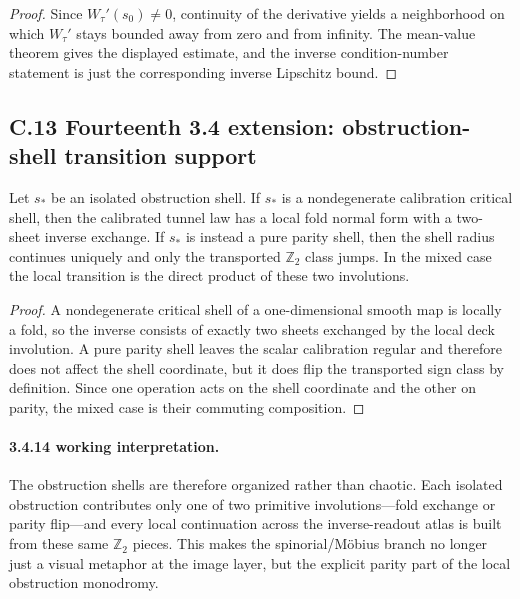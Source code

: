 \begin{proof}
Since $W_\tau'(s_0)\neq 0$, continuity of the derivative yields a neighborhood on which $W_\tau'$ stays bounded away from zero and from infinity. The mean-value theorem gives the displayed estimate, and the inverse condition-number statement is just the corresponding inverse Lipschitz bound.
\end{proof}


\subsection*{C.13 Fourteenth 3.4 extension: obstruction-shell transition support}

\begin{theorem}
\label{thm:appendix-3414}
Let $s_\ast$ be an isolated obstruction shell. If $s_\ast$ is a nondegenerate calibration critical shell, then the calibrated tunnel law has a local fold normal form with a two-sheet inverse exchange. If $s_\ast$ is instead a pure parity shell, then the shell radius continues uniquely and only the transported $\mathbb Z_2$ class jumps. In the mixed case the local transition is the direct product of these two involutions.
\end{theorem}

\begin{proof}
A nondegenerate critical shell of a one-dimensional smooth map is locally a fold, so the inverse consists of exactly two sheets exchanged by the local deck involution. A pure parity shell leaves the scalar calibration regular and therefore does not affect the shell coordinate, but it does flip the transported sign class by definition. Since one operation acts on the shell coordinate and the other on parity, the mixed case is their commuting composition.
\end{proof}

\paragraph{3.4.14 working interpretation.}
The obstruction shells are therefore organized rather than chaotic. Each isolated obstruction contributes only one of two primitive involutions---fold exchange or parity flip---and every local continuation across the inverse-readout atlas is built from these same $\mathbb Z_2$ pieces. This makes the spinorial/M\"obius branch no longer just a visual metaphor at the image layer, but the explicit parity part of the local obstruction monodromy.

